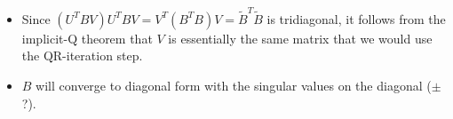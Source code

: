 \documentclass[a4paper,8pt]{beamer} %
\begin{document}
\begin{frame}
\begin{itemize}
\begin{enumerate}
\begin{equation}
\begin{footnotesize}
{								0 & 0 & 0 & 0 & \times  \\
							}
						\end{footnotesize}
					\end{equation}
					and so on... 
				\item After $2n-2$ iterations the matrix will be back on bidiagonal form.
			\end{enumerate}
		\item <2-> Since $(U^T B V)U^T B V = V^T(B^TB)V = \tilde B^T\tilde B$ is tridiagonal, 
			it follows from the implicit-Q theorem that $V$ is essentially the same matrix that we would use
			the QR-iteration step.
		\item <3-> $B$ will converge to diagonal form with the singular values on the diagonal ($\pm$?).
	\end{itemize}
\end{frame}%
\end{document}
